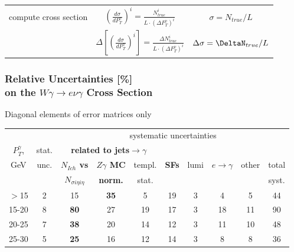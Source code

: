 \begin{frame}
\begin{table}[h]
\begin{center}
\begin{tabular}{|l|c|c|}
    compute cross section & $ \left( \frac{d\sigma}{dP_{T}^\gamma} \right) ^i = \frac{N_{true}^i}{L \cdot (\Delta P_T^\gamma)^i}$  &  $\sigma = N_{true}/L$       \\ 
                          & {\color{blue}$ \Delta \left[ \left( \frac{d\sigma}{dP_{T}^\gamma} \right) ^i \right]= \frac{\Delta N_{true}^i}{L \cdot (\Delta P_T^\gamma)^i}$ } &  {\color{blue}$\Delta\sigma = \DeltaN_{true}/L$   }    \\ \hline

  \end{tabular}
  \end{center}
\end{table}

\end{frame}%

\begin{frame}\frametitle{Relative Uncertainties [\%]\\
  on the $W\gamma\rightarrow e\nu\gamma$ Cross Section}
\footnotesize
Diagonal elements of error matrices only
\begin{table}[h]
  \tiny
  \begin{center}
   \begin{tabular}{|c|c|c|c|c|c|c|c|c|c|}
   \hline
                  &       & \multicolumn{8}{|c|}{systematic uncertainties}     \\
    $P_T^{\gamma}$, & stat. & \multicolumn{3}{|c|}{\color{blue}\bfseries{related to jets$\rightarrow\gamma$}} &  &  &  &  & \\
    GeV           & unc.  & {\color{blue}\bfseries{$N_{Ich}$ vs}}          &{\color{blue}\bfseries{$Z\gamma$ MC}} & templ. & {\color{blue}\bfseries{SFs}} & lumi &$e\rightarrow\gamma$ & other & total\\ 
                  &       & {\color{blue}\bfseries{$N_{\sigma{i\eta i\eta}}$}} & {\color{blue}\bfseries{norm.}}       & stat.  &  &  & &  & syst.\\ \hline
    $>$15  & 2 & 15 & {\color{blue}\bfseries{35}} & 5 & 19 & 3 & 4 & 5 & 44 \\ \hline
    15-20 & 8 & {\color{blue}\bfseries{80}} & 27 & 19 & 17 & 3 & 18 & 11 & 90 \\ \hline
    20-25 & 7 & {\color{blue}\bfseries{38}} & 20 & 14 & 12 & 3 & 11 & 10 & 48 \\ \hline
    25-30 & 5 & {\color{blue}\bfseries{25}} & 16 & 12 & 14 & 3 & 8 & 8 & 36 \\ \hline

\end{tabular}
\end{center}
\end{table}
\end{frame}
